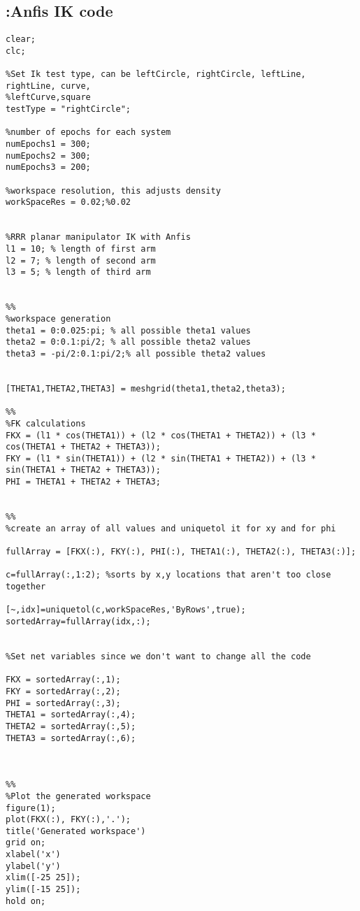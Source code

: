 \documentclass[a4paper,11pt]{article}
\begin{document}
\begin{appendices}
\section{:Anfis IK code}

\begin{lstlisting}[style=Matlab-editor,basicstyle=\color{black}\ttfamily\tiny]
%Inverse kinematics of a 3 link planar manipulator using Anfis
clear;
clc;

%Set Ik test type, can be leftCircle, rightCircle, leftLine, rightLine, curve,
%leftCurve,square
testType = "rightCircle";

%number of epochs for each system
numEpochs1 = 300;
numEpochs2 = 300;
numEpochs3 = 200;

%workspace resolution, this adjusts density
workSpaceRes = 0.02;%0.02 


%RRR planar manipulator IK with Anfis
l1 = 10; % length of first arm
l2 = 7; % length of second arm
l3 = 5; % length of third arm


%%
%workspace generation
theta1 = 0:0.025:pi; % all possible theta1 values
theta2 = 0:0.1:pi/2; % all possible theta2 values
theta3 = -pi/2:0.1:pi/2;% all possible theta2 values


[THETA1,THETA2,THETA3] = meshgrid(theta1,theta2,theta3);

%%
%FK calculations
FKX = (l1 * cos(THETA1)) + (l2 * cos(THETA1 + THETA2)) + (l3 * cos(THETA1 + THETA2 + THETA3));
FKY = (l1 * sin(THETA1)) + (l2 * sin(THETA1 + THETA2)) + (l3 * sin(THETA1 + THETA2 + THETA3));
PHI = THETA1 + THETA2 + THETA3; 


%%
%create an array of all values and uniquetol it for xy and for phi

fullArray = [FKX(:), FKY(:), PHI(:), THETA1(:), THETA2(:), THETA3(:)];

c=fullArray(:,1:2); %sorts by x,y locations that aren't too close together

[~,idx]=uniquetol(c,workSpaceRes,'ByRows',true); 
sortedArray=fullArray(idx,:);


%Set net variables since we don't want to change all the code

FKX = sortedArray(:,1);
FKY = sortedArray(:,2);
PHI = sortedArray(:,3);
THETA1 = sortedArray(:,4);
THETA2 = sortedArray(:,5);
THETA3 = sortedArray(:,6);



%%
%Plot the generated workspace
figure(1);
plot(FKX(:), FKY(:),'.');
title('Generated workspace')
grid on;
xlabel('x')
ylabel('y')
xlim([-25 25]);
ylim([-15 25]);
hold on;




\end{lstlisting}
\end{appendices}
\end{document}
